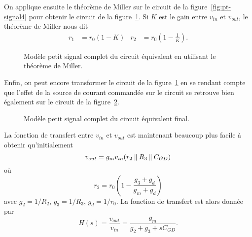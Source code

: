 \documentclass[frenchb,DIV=14]{scrartcl}
\begin{document}
On applique ensuite le théorème de Miller sur le circuit de la figure~\ref{fig:pt-signal4}
pour obtenir le circuit de la figure~\ref{fig:pt-signal5}.
Si $K$ est le gain entre $v_{in}$ et $v_{out}$, le théorème de Miller nous dit
\begin{align*}
	r_1 &= r_0(1-K) & r_2 &= r_0(1-\frac{1}{K}).
\end{align*}

\begin{figure}[h]
	\centering
	\caption{Modèle petit signal complet du circuit équivalent en utilisant le
	théorème de Miller.}
	\label{fig:pt-signal5}
\end{figure}

Enfin, on peut encore transformer le circuit de la figure~\ref{fig:pt-signal5}
en se rendant compte que l'effet de la source de courant commandée sur le circuit
se retrouve bien également sur le circuit de la figure~\ref{fig:pt-signal6}.

\begin{figure}[h]
	\centering
	\caption{Modèle petit signal complet du circuit équivalent final.}
	\label{fig:pt-signal6}
\end{figure}

La fonction de transfert entre $v_{in}$ et $v_{out}$ est maintenant beaucoup
plus facile à obtenir qu'initialement
\[ v_{out} = g_m v_{in} (r_2 \mathbin{\|} R_3 \mathbin{\|} C_{GD}) \]
où
\[ r_2 = r_0\left(1-\frac{g_3+g_d}{g_m+g_d}\right) \]
avec $g_2 = 1/R_2$, $g_3 = 1/R_3$, $g_d = 1/r_0$.
La fonction de transfert est alors donnée par
\[ H(s) = \frac{v_{out}}{v_{in}} = \frac{g_m}{g_2 + g_3 + sC_{GD}}. \]
\end{document}
